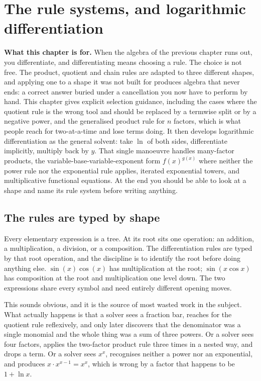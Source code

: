 \chapter{The rule systems, and logarithmic differentiation}

\begin{orient}
\textbf{What this chapter is for.} When the algebra of the previous chapter runs out, you differentiate, and differentiating means choosing a rule. The choice is not free. The product, quotient and chain rules are adapted to three different shapes, and applying one to a shape it was not built for produces algebra that never ends: a correct answer buried under a cancellation you now have to perform by hand. This chapter gives explicit selection guidance, including the cases where the quotient rule is the wrong tool and should be replaced by a termwise split or by a negative power, and the generalised product rule for $n$ factors, which is what people reach for two-at-a-time and lose terms doing. It then develops logarithmic differentiation as the general solvent: take $\ln$ of both sides, differentiate implicitly, multiply back by $y$. That single manoeuvre handles many-factor products, the variable-base-variable-exponent form $f(x)^{g(x)}$ where neither the power rule nor the exponential rule applies, iterated exponential towers, and multiplicative functional equations. At the end you should be able to look at a shape and name its rule system before writing anything.
\end{orient}

\section{The rules are typed by shape}

Every elementary expression is a tree. At its root sits one operation: an addition, a multiplication, a division, or a composition. The differentiation rules are typed by that root operation, and the discipline is to identify the root before doing anything else. $\sin(x)\cos(x)$ has multiplication at the root; $\sin(x\cos x)$ has composition at the root and multiplication one level down. The two expressions share every symbol and need entirely different opening moves.

This sounds obvious, and it is the source of most wasted work in the subject. What actually happens is that a solver sees a fraction bar, reaches for the quotient rule reflexively, and only later discovers that the denominator was a single monomial and the whole thing was a sum of three powers. Or a solver sees four factors, applies the two-factor product rule three times in a nested way, and drops a term. Or a solver sees $x^{x}$, recognises neither a power nor an exponential, and produces $x\cdot x^{x-1}=x^{x}$, which is wrong by a factor that happens to be $1+\ln x$.


